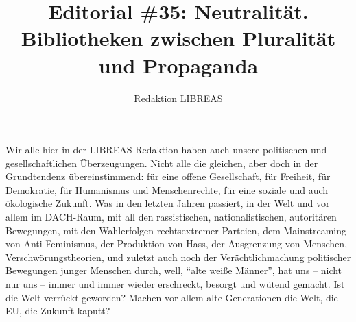 \documentclass[a4paper,
fontsize=11pt,
oneside,
numbers=noperiodatend,
parskip=half-,
bibliography=totoc,
final
]{scrartcl}
\title{\LARGE{Editorial \#35: Neutralität. Bibliotheken zwischen Pluralität und Propaganda}}%
\author{Redaktion LIBREAS} %
\date{}
\begin{document}
\maketitle
\thispagestyle{fancyplain} 


Wir alle hier in der LIBREAS-Redaktion haben auch unsere politischen und
gesellschaftlichen Überzeugungen. Nicht alle die gleichen, aber doch in
der Grundtendenz übereinstimmend: für eine offene Gesellschaft, für
Freiheit, für Demokratie, für Humanismus und Menschenrechte, für eine
soziale und auch ökologische Zukunft. Was in den letzten Jahren
passiert, in der Welt und vor allem im DACH-Raum, mit all den
rassistischen, nationalistischen, autoritären Bewegungen, mit den
Wahlerfolgen rechtsextremer Parteien, dem Mainstreaming von
Anti-Feminismus, der Produktion von Hass, der Ausgrenzung von Menschen,
Verschwörungstheorien, und zuletzt auch noch der Verächtlichmachung
politischer Bewegungen junger Menschen durch, well, \enquote{alte weiße
Männer}, hat uns -- nicht nur uns -- immer und immer wieder erschreckt,
besorgt und wütend gemacht. Ist die Welt verrückt geworden? Machen vor
allem alte Generationen die Welt, die EU, die Zukunft kaputt?
\end{document}

